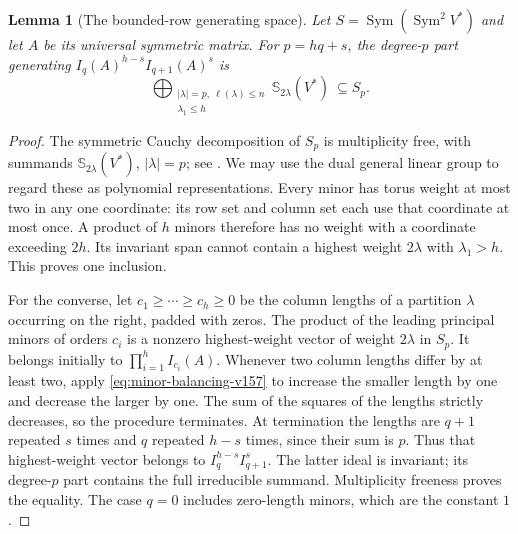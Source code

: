 \documentclass[11pt,reqno]{amsart}
\numberwithin{equation}{section}
\newtheorem{lemma}[theorem]{Lemma}
\theoremstyle{definition}\newtheorem{definition}[theorem]{Definition}
\theoremstyle{remark}\newtheorem{remark}[theorem]{Remark}
\DeclareMathOperator{\Sym}{Sym}\DeclareMathOperator{\Gr}{Gr}
\begin{document}
\begin{lemma}[The bounded-row generating space]
\label{lem:bounded-row-v157}
Let $S=\Sym(\Sym^2V^*)$ and let $A$ be its universal symmetric matrix.
For $p=hq+s$, the degree-$p$ part generating
$I_q(A)^{h-s}I_{q+1}(A)^s$ is
\begin{equation}\label{eq:bounded-row-v157}
 \bigoplus_{\substack{|\lambda|=p,\ \ell(\lambda)\leq n\\
                         \lambda_1\leq h}}\mathbb S_{2\lambda}(V^*)
                         \ \subseteq S_p.
\end{equation}
\end{lemma}
\begin{proof}
The symmetric Cauchy decomposition of $S_p$ is multiplicity free,
with summands $\mathbb S_{2\lambda}(V^*)$, $|\lambda|=p$; see
\cite[\S2.4]{HenriquesVarbaro2016}. We may use the dual general
linear group to regard these as polynomial representations. Every
minor has torus weight at most two in any one coordinate: its row
set and column set each use that coordinate at most once. A product
of $h$ minors therefore has no weight with a coordinate exceeding
$2h$. Its invariant span cannot contain a highest weight
$2\lambda$ with $\lambda_1>h$. This proves one inclusion.

For the converse, let $c_1\geq\cdots\geq c_h\geq0$ be the column
lengths of a partition $\lambda$ occurring on the right, padded with
zeros. The product of the leading principal minors of orders $c_i$
is a nonzero highest-weight vector of weight $2\lambda$ in $S_p$.
It belongs initially to $\prod_{i=1}^h I_{c_i}(A)$.
Whenever two column lengths differ by at least two, apply
\eqref{eq:minor-balancing-v157} to increase the smaller length by one
and decrease the larger by one. The sum of the squares of the lengths
strictly decreases, so the procedure terminates. At termination the
lengths are $q+1$ repeated $s$ times and $q$ repeated $h-s$ times,
since their sum is $p$. Thus that highest-weight vector belongs to
$I_q^{h-s}I_{q+1}^s$. The latter ideal is invariant; its degree-$p$
part contains the full irreducible summand. Multiplicity freeness
proves the equality. The case $q=0$ includes zero-length minors,
which are the constant $1$.
\end{proof}
\end{document}
